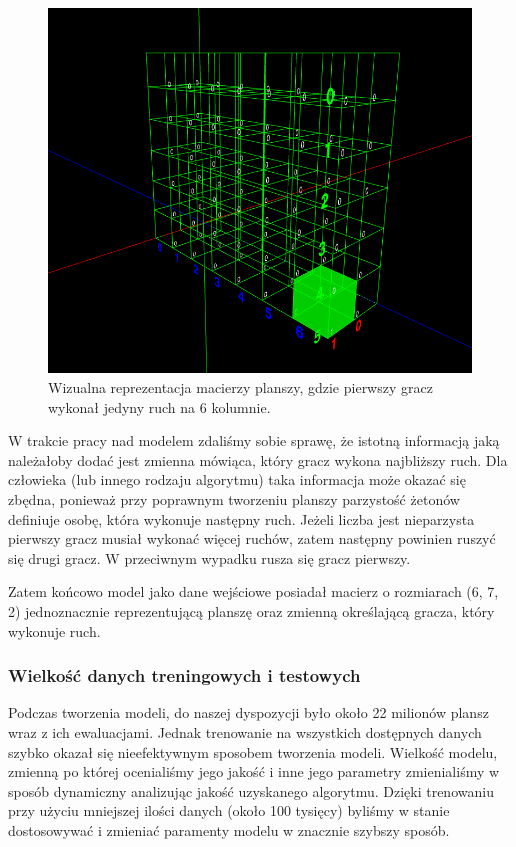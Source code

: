 \documentclass[12pt]{article}
\begin{document}
\begin{figure}[!ht]
    \centering
    \includegraphics[scale=0.40]{board.png}
    \caption{Wizualna reprezentacja macierzy planszy, gdzie pierwszy gracz wykonał jedyny ruch na 6 kolumnie.}
\end{figure}

W trakcie pracy nad modelem zdaliśmy sobie sprawę, że istotną informacją jaką należałoby dodać jest zmienna mówiąca, który gracz wykona najbliższy ruch. Dla człowieka (lub innego rodzaju algorytmu) taka informacja może okazać się zbędna, ponieważ przy poprawnym tworzeniu planszy parzystość żetonów definiuje osobę, która wykonuje następny ruch. Jeżeli liczba jest nieparzysta pierwszy gracz musiał wykonać więcej ruchów, zatem następny powinien ruszyć się drugi gracz. W przeciwnym wypadku rusza się gracz pierwszy.

Zatem końcowo model jako dane wejściowe posiadał macierz o rozmiarach (6, 7, 2) jednoznacznie reprezentującą planszę oraz zmienną określającą gracza, który wykonuje ruch.

\subsubsection{Wielkość danych treningowych i testowych}

Podczas tworzenia modeli, do naszej dyspozycji było około 22 milionów plansz wraz z ich ewaluacjami. Jednak trenowanie na wszystkich dostępnych danych szybko okazał się nieefektywnym sposobem tworzenia modeli. Wielkość modelu, zmienną po której ocenialiśmy jego jakość i inne jego parametry zmienialiśmy w sposób dynamiczny analizując jakość uzyskanego algorytmu. Dzięki trenowaniu przy użyciu mniejszej ilości danych (około 100 tysięcy) byliśmy w stanie dostosowywać i zmieniać paramenty modelu w znacznie szybszy sposób.
\end{document}
